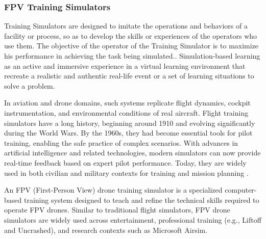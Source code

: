 
\subsubsection{FPV Training Simulators}

Training Simulators are designed to imitate the operations and behaviors of a facility or process, so as to develop the skills or experiences of the operators who use them. The objective of the operator of the Training Simulator is to maximize his performance in achieving the task being simulated.\parencite{narayanasamy_distinguishing_2006}. Simulation-based learning as an active and immersive experience in a virtual learning environment that recreate a realistic and authentic real-life event or a set of learning situations to solve a problem.\parencite{dai_educational_2022}

In aviation and drone domains, such systems replicate flight dynamics, cockpit instrumentation, and environmental conditions of real aircraft. Flight training simulators have a long history, beginning around 1910 and evolving significantly during the World Wars. By the 1960s, they had become essential tools for pilot training, enabling the safe practice of complex scenarios. With advances in artificial intelligence and related technologies, modern simulators can now provide real-time feedback based on expert pilot performance. Today, they are widely used in both civilian and military contexts for training and mission planning \parencite{pappas_generic_2025}.

An FPV (First-Person View) drone training simulator is a specialized computer-based training system designed to teach and refine the technical skills required to operate FPV drones. Similar to traditional flight simulators, FPV drone simulators are widely used across entertainment, professional training (e.g., Liftoff and Uncrashed), and research contexts such as Microsoft Airsim. 
